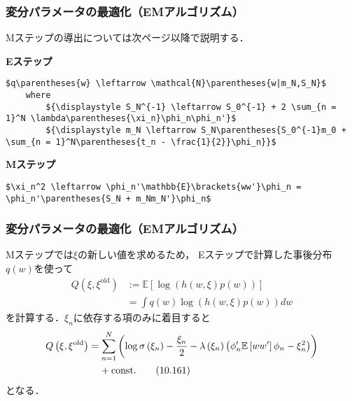 \documentclass[10pt,hyperref={unicode}]{beamer}
\newcommand{\parentheses}[1]{\left(#1\right)}
\newcommand{\brackets}[1]{\left[#1\right]}
\begin{document}
\begin{frame}[fragile]
\frametitle{変分パラメータの最適化（EMアルゴリズム）}
Mステップの導出については次ページ以降で説明する．

\bigskip

\textbf{Eステップ}
\begin{lstlisting}[mathescape,lineskip={5pt}]
    $q\parentheses{w} \leftarrow \mathcal{N}\parentheses{w|m_N,S_N}$
    where
        ${\displaystyle S_N^{-1} \leftarrow S_0^{-1} + 2 \sum_{n = 1}^N \lambda\parentheses{\xi_n}\phi_n\phi_n'}$
        ${\displaystyle m_N \leftarrow S_N\parentheses{S_0^{-1}m_0 + \sum_{n = 1}^N\parentheses{t_n - \frac{1}{2}}\phi_n}}$
\end{lstlisting}

\smallskip

\textbf{Mステップ}
\begin{lstlisting}[mathescape,lineskip={5pt}]
    $\xi_n^2 \leftarrow \phi_n'\mathbb{E}\brackets{ww'}\phi_n = \phi_n'\parentheses{S_N + m_Nm_N'}\phi_n$
\end{lstlisting}

\end{frame}

\begin{frame}
\frametitle{変分パラメータの最適化（EMアルゴリズム）}
Mステップでは$\xi$の新しい値を求めるため，
Eステップで計算した事後分布$q\parentheses{w}$を使って
\begin{align*}
    Q\parentheses{\xi,\xi^{\mathrm{old}}}
    &:= \mathbb{E}\brackets{\log\parentheses{h\parentheses{w,\xi}p\parentheses{w}}} \\
    &= \int q\parentheses{w} \log \parentheses{h\parentheses{w,\xi}p\parentheses{w}}dw
\end{align*}
を計算する．$\xi_n$に依存する項のみに着目すると
\begin{align}
    Q\parentheses{\xi,\xi^{\mathrm{old}}}
    &= \sum_{n = 1}^N \parentheses{\log \sigma\parentheses{\xi_n} - \frac{\xi_n}{2} - \lambda\parentheses{\xi_n}
            \parentheses{\phi_n'\mathbb{E}\brackets{ww'}\phi_n - \xi_n^2}} \notag \\
    &\phantom{=}\ + \mathrm{const.} \tag{10.161}
\end{align}
となる．
\end{frame}
\end{document}
